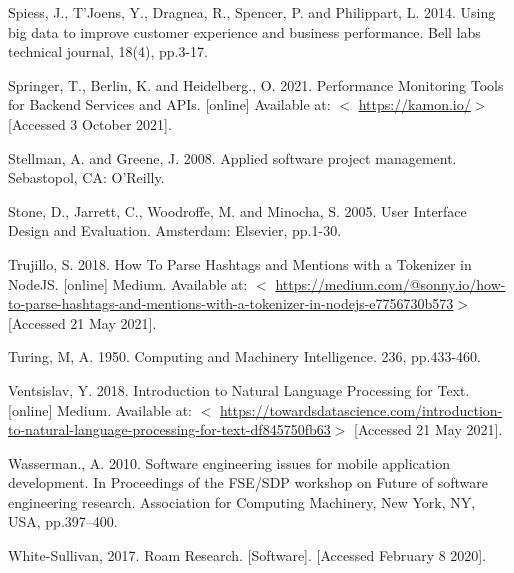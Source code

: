 \documentclass{article}
\begin{document}
{Spiess, J., T'Joens, Y., Dragnea, R., Spencer, P. and Philippart, L. 2014. Using big data to improve customer experience and business performance. Bell labs technical journal, 18(4), pp.3-17.

Springer, T., Berlin, K. and Heidelberg., O. 2021. Performance Monitoring Tools for Backend Services and APIs. [online] Available at: $<$ \url{https://kamon.io/}$>$ [Accessed 3 October 2021].

Stellman, A. and Greene, J. 2008. Applied software project management. Sebastopol, CA: O'Reilly.

Stone, D., Jarrett, C., Woodroffe, M. and Minocha, S. 2005. User Interface Design and Evaluation. Amsterdam: Elsevier, pp.1-30.

Trujillo, S. 2018. How To Parse Hashtags and Mentions with a Tokenizer in NodeJS. [online] Medium. Available at: $<$ \url{https://medium.com/@sonny.io/how-to-parse-hashtags-and-mentions-with-a-tokenizer-in-nodejs-e7756730b573}$>$ [Accessed 21 May 2021].

Turing, M, A. 1950. Computing and Machinery Intelligence. 236, pp.433-460.

Ventsislav, Y. 2018. Introduction to Natural Language Processing for Text. [online] Medium. Available at: $<$ \url{https://towardsdatascience.com/introduction-to-natural-language-processing-for-text-df845750fb63}$>$ [Accessed 21 May 2021].

Wasserman., A. 2010. Software engineering issues for mobile application development. In Proceedings of the FSE/SDP workshop on Future of software engineering research. Association for Computing Machinery, New York, NY, USA, pp.397–400. 

White-Sullivan, 2017. Roam Research. [Software]. [Accessed February 8 2020].

}

\newpage
\end{document}
